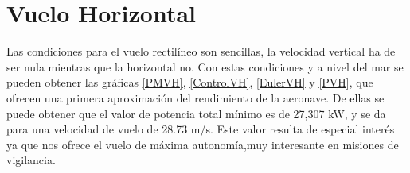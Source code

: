 \thispagestyle{empty}
\chapter{Vuelo Horizontal}


Las condiciones para el vuelo rectilíneo son sencillas, la velocidad vertical ha de ser nula mientras que la horizontal no. Con estas condiciones y a nivel del mar se pueden obtener las gráficas \ref{PMVH}, \ref{ControlVH}, \ref{EulerVH} y \ref{PVH}, que ofrecen una primera aproximación del rendimiento de la aeronave. De ellas se puede obtener que el valor de potencia total mínimo es de 27,307 kW, y se da para una velocidad de vuelo de 28.73 m/s. Este valor resulta de especial interés ya que nos ofrece el vuelo de máxima autonomía,muy interesante en misiones de vigilancia.

